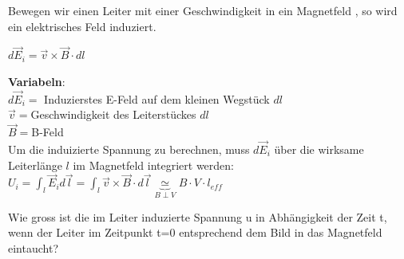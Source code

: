 \newpage

\begingl
Bewegen wir einen Leiter mit einer Geschwindigkeit in ein Magnetfeld , so wird ein elektrisches Feld induziert.

\formulaBegin
$ \displaystyle d\vec{E}_i = \vec{v} \times \vec{B}  \cdot dl$
\formulaEnd

\textbf{Variabeln}: \\
$ d\vec{E}_i =$ Induzierstes E-Feld auf dem kleinen Wegstück $dl$ \\
$ \vec{v} = $Geschwindigkeit des Leiterstückes $ dl $ \\
$ \vec{B} = $B-Feld \\

Um die induizierte Spannung zu berechnen, muss $d\vec{E}_i$ über die wirksame Leiterlänge $l$ im Magnetfeld  integriert werden: \\
\formulaBegin
$\displaystyle U_{i} = \int_l  \vec{E}_i d\vec{l}= \int_l \vec{v} \times \vec{B}  \cdot d\vec{l} \underbrace{\simeq}_{B \perp V} B \cdot V \cdot l_{eff}$
\formulaEnd

\iend



\beginbsp
Wie gross ist die im Leiter induzierte Spannung u in Abhängigkeit der Zeit t, wenn der Leiter im Zeitpunkt t=0 entsprechend dem Bild in das Magnetfeld eintaucht?
\begin{center}
\end{center}
\iend
\newpage




